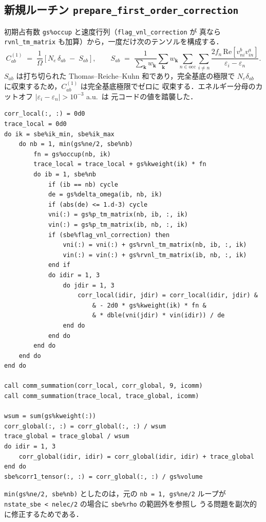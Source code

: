 \documentclass[dvipdfmx,a4paper,11pt]{jsarticle}
\newcommand{\vk}{\bm{k}}
\newcommand{\Real}{\mathrm{Re}}
\newcommand{\eps}{\varepsilon}
\begin{document}
\subsection{新規ルーチン \texttt{prepare\_first\_order\_correction}}
初期占有数 \texttt{gs\%occup} と速度行列（\texttt{flag\_vnl\_correction} が
真なら \texttt{rvnl\_tm\_matrix} も加算）から，一度だけ次のテンソルを構成する．
\[
  C^{(1)}_{ab} \;=\; \frac{1}{\Omega}\left[
    N_e\,\delta_{ab} \;-\; S_{ab}
  \right],\qquad
  S_{ab} \;=\; \frac{1}{\sum_\vk w_\vk}\sum_\vk w_\vk
    \sum_{n\in\mathrm{occ}}\sum_{i\neq n}
    \frac{2 f_n\,\Real\!\left[v^b_{ni}v^a_{in}\right]}{\eps_i-\eps_n}.
\]
$S_{ab}$ は打ち切られた Thomas--Reiche--Kuhn 和であり，完全基底の極限で
$N_e\delta_{ab}$ に収束するため，$C^{(1)}_{ab}$ は完全基底極限でゼロに
収束する．エネルギー分母のカットオフ $|\eps_i-\eps_n|>10^{-3}$ a.u.\ は
元コードの値を踏襲した．
\begin{lstlisting}[caption={\texttt{prepare\_first\_order\_correction} の中核部分}]
corr_local(:, :) = 0d0
trace_local = 0d0
do ik = sbe%ik_min, sbe%ik_max
    do nb = 1, min(gs%ne/2, sbe%nb)
        fn = gs%occup(nb, ik)
        trace_local = trace_local + gs%kweight(ik) * fn
        do ib = 1, sbe%nb
            if (ib == nb) cycle
            de = gs%delta_omega(ib, nb, ik)
            if (abs(de) <= 1.d-3) cycle
            vni(:) = gs%p_tm_matrix(nb, ib, :, ik)
            vin(:) = gs%p_tm_matrix(ib, nb, :, ik)
            if (sbe%flag_vnl_correction) then
                vni(:) = vni(:) + gs%rvnl_tm_matrix(nb, ib, :, ik)
                vin(:) = vin(:) + gs%rvnl_tm_matrix(ib, nb, :, ik)
            end if
            do idir = 1, 3
                do jdir = 1, 3
                    corr_local(idir, jdir) = corr_local(idir, jdir) &
                        & - 2d0 * gs%kweight(ik) * fn &
                        & * dble(vni(jdir) * vin(idir)) / de
                end do
            end do
        end do
    end do
end do

call comm_summation(corr_local, corr_global, 9, icomm)
call comm_summation(trace_local, trace_global, icomm)

wsum = sum(gs%kweight(:))
corr_global(:, :) = corr_global(:, :) / wsum
trace_global = trace_global / wsum
do idir = 1, 3
    corr_global(idir, idir) = corr_global(idir, idir) + trace_global
end do
sbe%corr1_tensor(:, :) = corr_global(:, :) / gs%volume
\end{lstlisting}
\texttt{min(gs\%ne/2, sbe\%nb)} としたのは，元の \texttt{nb = 1, gs\%ne/2} ループが
\texttt{nstate\_sbe < nelec/2} の場合に \texttt{sbe\%rho} の範囲外を参照し
うる問題を副次的に修正するためである．
\end{document}
